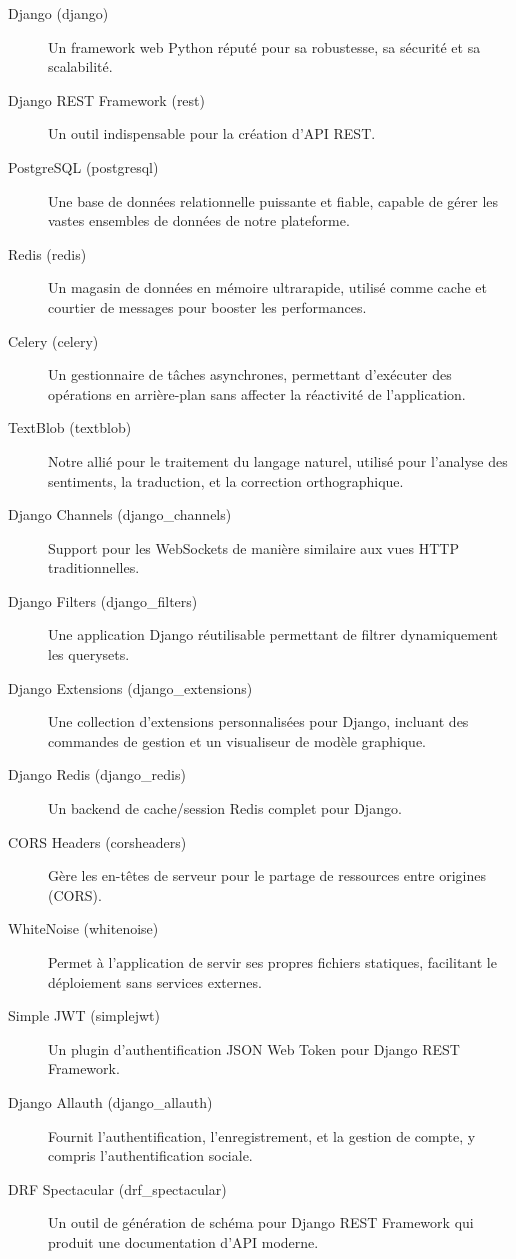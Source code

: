 \begin{description}
    \item[Django (\gls{django})] Un framework web Python réputé pour sa robustesse, sa sécurité et sa scalabilité.
    \item[Django REST Framework (\gls{rest})] Un outil indispensable pour la création d'API REST.
    \item[PostgreSQL (\gls{postgresql})] Une base de données relationnelle puissante et fiable, capable de gérer les vastes ensembles de données de notre plateforme.
    \item[Redis (\gls{redis})] Un magasin de données en mémoire ultrarapide, utilisé comme cache et courtier de messages pour booster les performances.
    \item[Celery (\gls{celery})] Un gestionnaire de tâches asynchrones, permettant d'exécuter des opérations en arrière-plan sans affecter la réactivité de l'application.
    \item[TextBlob (\gls{textblob})] Notre allié pour le traitement du langage naturel, utilisé pour l'analyse des sentiments, la traduction, et la correction orthographique.
    \item[Django Channels (\gls{django_channels})] Support pour les WebSockets de manière similaire aux vues HTTP traditionnelles.
    \item[Django Filters (\gls{django_filters})] Une application Django réutilisable permettant de filtrer dynamiquement les querysets.
    \item[Django Extensions (\gls{django_extensions})] Une collection d'extensions personnalisées pour Django, incluant des commandes de gestion et un visualiseur de modèle graphique.
    \item[Django Redis (\gls{django_redis})] Un backend de cache/session Redis complet pour Django.
    \item[CORS Headers (\gls{corsheaders})] Gère les en-têtes de serveur pour le partage de ressources entre origines (CORS).
    \item[WhiteNoise (\gls{whitenoise})] Permet à l'application de servir ses propres fichiers statiques, facilitant le déploiement sans services externes.
    \item[Simple JWT (\gls{simplejwt})] Un plugin d'authentification JSON Web Token pour Django REST Framework.
    \item[Django Allauth (\gls{django_allauth})] Fournit l'authentification, l'enregistrement, et la gestion de compte, y compris l'authentification sociale.
    \item[DRF Spectacular (\gls{drf_spectacular})] Un outil de génération de schéma pour Django REST Framework qui produit une documentation d'API moderne.
\end{description}

